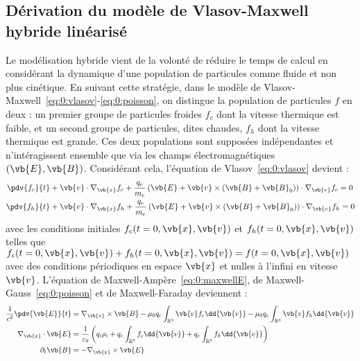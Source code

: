 \subsection{Dérivation du modèle de Vlasov-Maxwell hybride linéarisé}

Le modélisation hybride vient de la volonté de réduire le temps de calcul en considérant la dynamique d'une population de particules comme fluide et non plus cinétique. En suivant cette stratégie, dans le modèle de Vlasov-Maxwell~\eqref{eq:0:vlasov}-\eqref{eq:0:poisson}, on distingue la population de particules $f$ en deux : un premier groupe de particules froides $f_c$ dont la vitesse thermique est faible, et un second groupe de particules, dites chaudes, $f_h$ dont la vitesse thermique est grande. Ces deux populations sont supposées indépendantes et n'intéragissent ensemble que via les champs électromagnétiques $(\vb{E},\vb{B})$. Considérant cela, l'équation de Vlasov~\eqref{eq:0:vlasov} devient :
$$
  \begin{aligned}
    \pdv{f_c}{t} &+ \vb{v}\cdot\nabla_{\vb{x}} f_c + \frac{q_e}{m_e}\left( \vb{E} + \vb{v}\times(\vb{B}+\vb{B}_0) \right)\cdot\nabla_{\vb{v}} f_c = 0 \\
    \pdv{f_h}{t} &+ \vb{v}\cdot\nabla_{\vb{x}} f_h + \frac{q_e}{m_e}\left( \vb{E} + \vb{v}\times(\vb{B}+\vb{B}_0) \right)\cdot\nabla_{\vb{v}} f_h = 0
  \end{aligned}
$$
avec les conditions initiales $f_c(t=0,\vb{x},\vb{v})$ et $f_h(t=0,\vb{x},\vb{v})$ telles que $f_c(t=0,\vb{x},\vb{v})+f_h(t=0,\vb{x},\vb{v}) = f(t=0,\vb{x},\vb{v})$ avec des conditions périodiques en espace $\vb{x}$ et nulles à l'infini en vitesse $\vb{v}$. L'équation de Maxwell-Ampère~\eqref{eq:0:maxwellE}, de Maxwell-Gauss~\eqref{eq:0:poisson} et de Maxwell-Faraday deviennent :
$$
  \begin{aligned}
    \frac{1}{c^2}\pdv{\vb{E}}{t} &= \nabla_{\vb{x}}\times \vb{B} - \mu_0 q_e\int_{\mathbb{R}^3} \vb{v} f_c\dd{\vb{v}} - \mu_0 q_e\int_{\mathbb{R}^3} \vb{v} f_h\dd{\vb{v}} \\
    \nabla_{\vb{x}}\cdot\vb{E} &= \frac{1}{\varepsilon_0}\left( q_i\rho_i + q_e\int_{\mathbb{R}^3} f_c\dd{\vb{v}} + q_e\int_{\mathbb{R}^3} f_h\dd{\vb{v}} \right) \\
    \partial_t \vb{B} &= -\nabla_{\vb{x}}\times\vb{E}
  \end{aligned}
$$

